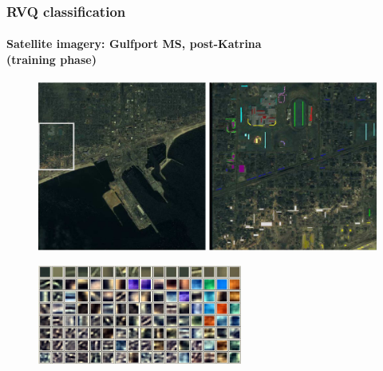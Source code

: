 \begin{frame}
\frametitle{RVQ classification}
\framesubtitle{\small Satellite imagery: Gulfport MS, post-Katrina \\(training phase)}
\logoCSIPCPL\mypagenum
	\begin{figure}		
		\includegraphics[width=1.0\textwidth]{figs/RVQ_SatelliteKatrina_1_snippets.png}			
	\end{figure}
	\begin{figure}		
		\includegraphics[width=0.6\textwidth]{figs/RVQ_SatelliteKatrina_2_codebooks.png}			
	\end{figure}
\end{frame}





